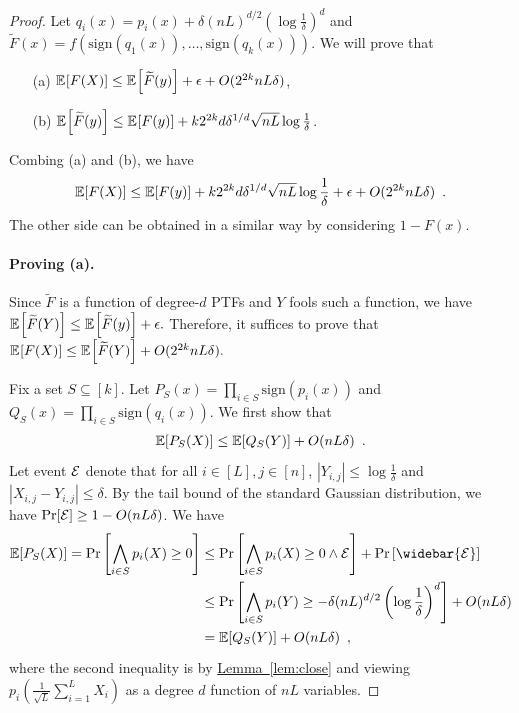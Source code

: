 \documentclass[12pt]{article}
\newcommand{\lem}[1]{\hyperref[lem:#1]{Lemma~\ref*{lem:#1}}}
\newcommand{\sign}[1]{\mathrm{sign}\!\br{#1}}
\newcommand{\br}[1]{\left(#1\right)} \newcommand{\Br}[1]{\left[#1\right]} \newcommand{\st}[1]{\left\{#1\right\}} \newcommand{\tr}[1]{\mathrm{Tr}\!\Br{#1}} \newcommand{\abs}[1]{\left|#1 \right|} \newcommand{\norm}[1]{\left\lVert #1 \right\rVert} \newcommand{\agl}[2]{\theta^{\br{#1}}_{#2}} \newcommand{\aglp}[2]{{\theta'}^{\br{#1}}_{#2}} \newcommand{\lint}[1]{\left\lfloor#1\right\rfloor} \newcommand{\poly}[1]{\mathrm{poly}\!\br{#1}} \newcommand{\negl}[1]{\mathrm{negl}\!\br{#1}} \newcommand{\de}[1]{\mathrm{d}#1} \newcommand{\val}[1]{\mathrm{val}\!\br{#1}} \newcommand{\vall}[1]{\mathrm{val}\br{#1}} \newcommand{\nd}[1]{\mathcal{N}\!\br{#1}} \newcommand{\ketbratwo}[2]{\ket{#1} \hspace{-0.4em}\bra{#2}} \newcommand{\ketbra}[1]{\ketbratwo{#1}{#1}} \newcommand{\id}{\ensuremath{\mathds{1}}} \newcommand{\ogroup}[1]{\mathrm{O}\!\br{#1}} \newcommand{\ugroup}[1]{\mathrm{U}\!\br{#1}} \newcommand{\td}{\mathrm{TD}} \newcommand{\tv}[1]{\norm{#1}_{\mathrm{TV}}} \newcommand {\defeq} {\ensuremath{ \stackrel{\mathrm{def}}{=} }} \newcommand{\vdim}{\ensuremath{N}} \newcommand{\dimin}{\ensuremath{n}} \newcommand{\dimout}{\ensuremath{m}} \newcommand{\ncopy}{\ell} \newcommand{\hspacein}{\H_\mathrm{in}} \newcommand{\hspaceout}{\H_\mathrm{out}} \newcommand{\Sin}{\S(\hspacein)} \newcommand{\Sout}{\S(\hspaceout)} \newcommand{\haar}{\ensuremath{\mu}} \newcommand{\tensorhaar}{\ensuremath{\eta}} \newcommand{\tensorsrss}{\ensuremath{\nu}} \newcommand{\qadvice}{\ensuremath{\rho}} \newcommand{\tp}{\otimes} \newcommand{\wone}[2]{W_1\!\br{#1,#2}}
\begin{document}
\begin{proof}
	Let $q_i(x) = p_i(x)+ \delta (nL)^{d/2} \br{\log\frac{1}{\delta}}^{d}$ and $\widetilde{F}(x) = f\!\br{\sign{q_1\!(x)},\dots,\sign{q_k\!(x)}}$.
	We will prove that
	\begin{itemize}
		\item[(a)] $\expect{}{
			F(X)	
		} \leq \expect{}{
			\widetilde{F}(y)	
		} + \epsilon + O(2^{2k}nL\delta)$,
		\item[(b)] $\expect{}{
			\widetilde{F}(y)	
		} \leq \expect{}{
			F(y)	
		} + k2^{2k} d \delta^{1/d} \sqrt{nL} \log\frac{1}{\delta}$.
	\end{itemize}
	Combing (a) and (b), we have
	\[
		\expect{}{
			F(X)	
		} \leq \expect{}{
			F(y)	
		} + k2^{2k} d \delta^{1/d} \sqrt{nL} \log\frac{1}{\delta} + \epsilon + O(2^{2k}nL\delta)\enspace.
	\]
	The other side can be obtained in a similar way by considering $1-F(x)$.

	\paragraph{Proving (a).}
	Since $\widetilde{F}$ is a function of degree-$d$ PTFs and $Y$ fools such a function,
	we have
	$
		\expect{}{
			\widetilde{F}(Y)	
		} \leq \expect{}{
			\widetilde{F}(y)	
		} + \epsilon .
	$
	Therefore, it suffices to prove that
	$
		\expect{}{
			F(X)	
		} \leq \expect{}{
			\widetilde{F}(Y)	
		} + O(2^{2k}nL\delta).
	$
	
	Fix a set $S\subseteq [k]$. Let $P_S(x)= \prod_{i\in S} \sign{p_i(x)}$ and $Q_S(x) = \prod_{i\in S} \sign{q_i(x)}$.
	We first show that
	\begin{align*}
		\expect{}{
			P_S(X)	
		} \leq \expect{}{
			Q_S(Y)	
		} + O(nL\delta) \enspace.
	\end{align*}
	Let event $\mathcal{E}$ denote that for all $i\in [L],  j\in [n]$, $\abs{Y_{i,j}} \leq \log \frac{1}{\delta}$ and $\abs{X_{i,j}-Y_{i,j}}\leq \delta$. By the tail bound of the standard Gaussian distribution, we have $\Pr[\mathcal{E}]\geq 1 - O(nL\delta)$.
	We have
	\begin{align*}
		\expect{}{
			P_S(X)	
		} = \Pr \Br{ \bigwedge_{i\in S} p_i(X)\geq 0 } &\leq \Pr \Br{ \bigwedge_{i\in S} p_i(X)\geq 0 \wedge \EE} + \Pr\Br{\widebar{\EE}}\\
		&\leq \Pr \Br{ \bigwedge_{i\in S} p_i(Y)\geq -\delta (nL)^{d/2} \br{\log\frac{1}{\delta}}^{d} } + O(nL\delta) \\
		&=\expect{}{
			Q_S(Y)	
		} + O(nL\delta) \enspace,
	\end{align*}
	where the second inequality is by \lem{close} and viewing $p_i\!\br{\frac{1}{\sqrt{L}}\sum_{i=1}^L X_i}$ as a degree $d$ function of $nL$ variables.



\end{proof}
\end{document}
